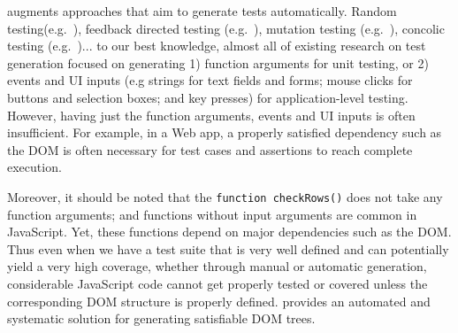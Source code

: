 \tool augments approaches that aim to generate tests automatically.  
Random testing(e.g.~\cite{artemis}), feedback directed testing (e.g.~\cite{feedbackConcolic}), mutation testing (e.g.~\cite{pythia}), concolic testing (e.g.~\cite{eventConcolic, kudzu, jalangi, cute})... 
to our best knowledge, almost all of existing research on test generation focused on generating 1) function arguments for unit testing, or 2) events and UI inputs (e.g strings for text fields and forms; mouse clicks for buttons and selection boxes; and key presses) for application-level testing.
However, having just the function arguments, events and UI inputs is often insufficient.  For example, in a Web app, a properly satisfied dependency such as the DOM is often necessary for test cases and assertions to reach complete execution.  

Moreover, it should be noted that the {\tt function checkRows()} does not take any function arguments; and functions without input arguments are common in JavaScript.
Yet, these functions depend on major dependencies such as the DOM.
Thus even when we have a test suite that is very well defined and can potentially yield a very high coverage, whether through manual or automatic generation, considerable JavaScript code cannot get properly tested or covered unless the corresponding DOM structure is properly defined.  
\tool provides an automated and systematic solution for generating satisfiable DOM trees.  



